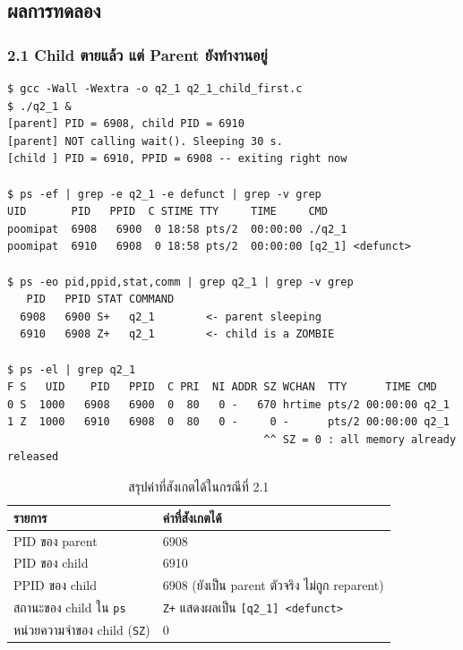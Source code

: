 \documentclass[a4paper,12pt]{article}
\newcommand{\code}[1]{\texttt{#1}}
\begin{document}
\newpage

\subsection{ผลการทดลอง}

\subsubsection{2.1 Child ตายแล้ว แต่ Parent ยังทำงานอยู่}

\begin{lstlisting}[style=terminal,caption={ผลลัพธ์และสถานะจาก \texttt{ps} ในกรณีที่ 2.1}]
$ gcc -Wall -Wextra -o q2_1 q2_1_child_first.c
$ ./q2_1 &
[parent] PID = 6908, child PID = 6910
[parent] NOT calling wait(). Sleeping 30 s.
[child ] PID = 6910, PPID = 6908 -- exiting right now

$ ps -ef | grep -e q2_1 -e defunct | grep -v grep
UID       PID   PPID  C STIME TTY     TIME     CMD
poomipat  6908   6900  0 18:58 pts/2  00:00:00 ./q2_1
poomipat  6910   6908  0 18:58 pts/2  00:00:00 [q2_1] <defunct>

$ ps -eo pid,ppid,stat,comm | grep q2_1 | grep -v grep
   PID   PPID STAT COMMAND
  6908   6900 S+   q2_1        <- parent sleeping
  6910   6908 Z+   q2_1        <- child is a ZOMBIE

$ ps -el | grep q2_1
F S   UID    PID   PPID  C PRI  NI ADDR SZ WCHAN  TTY      TIME CMD
0 S  1000   6908   6900  0  80   0 -   670 hrtime pts/2 00:00:00 q2_1
1 Z  1000   6910   6908  0  80   0 -     0 -      pts/2 00:00:00 q2_1
                                        ^^ SZ = 0 : all memory already released
\end{lstlisting}

\begin{table}[H]
\centering
\caption{สรุปค่าที่สังเกตได้ในกรณีที่ 2.1}
\begin{tabular}{ll}
\toprule
\textbf{รายการ} & \textbf{ค่าที่สังเกตได้} \\
\midrule
PID ของ parent & 6908 \\
PID ของ child & 6910 \\
PPID ของ child & 6908 \quad (ยังเป็น parent ตัวจริง ไม่ถูก reparent) \\
สถานะของ child ใน \code{ps} & \code{Z+} แสดงผลเป็น \code{[q2\_1] <defunct>} \\
หน่วยความจำของ child (\code{SZ}) & 0 \\
\bottomrule
\end{tabular}
\end{table}
\end{document}
